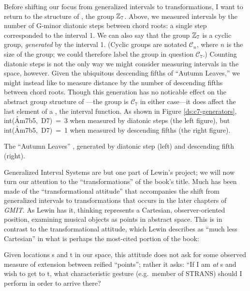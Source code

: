 \documentclass[diss]{subfiles}
\begin{document}
Before shifting our focus from generalized intervals to transformations, I
want to return to the structure of \ivls{}, the group $\mathbb{Z}_7$. Above, we
measured intervals by the number of G-minor diatonic steps between chord
roots: a single step corresponded to the interval 1. We can also say that the
group $\mathbb{Z}_7$ is a cyclic group, \emph{generated} by the interval 1. (Cyclic
groups are notated $\mathcal{C}_n$, where $n$ is the size of the group; we
could therefore label the group in question $\mathcal{C}_7$.) Counting
diatonic steps is not the only way we might consider measuring intervals in
the space, however. Given the ubiquitous descending fifths of “Autumn Leaves,”
we might instead like to measure distance by the number of descending fifths
between chord roots. Though this generation has no noticable effect on the
abstract group structure of \ivls{}---the group is $\mathcal{C}_7$ in either
case---it does affect the last element of a \gis{}, the interval
function. As shown in Figure \ref{ds:c7-generators},
\mbox{int(\h{Am7b5}, D7) = 3} when measured by diatonic steps (the left
figure), but \mbox{int(\h{Am7b5}, D7) = 1} when measured by descending fifths
(the right figure).

\figBeg
  \caption[The “Autumn Leaves” \gis{}, generated by diatonic step and descending
    fifth.]{The “Autumn Leaves” \gis{}, generated by diatonic step (left) and
    descending fifth (right).}
  \label{ds:c7-generators}
\figEnd

Generalized Interval Systems are but one part of Lewin’s project; we will now
turn our attention to the “transformations” of the book’s title. Much has been
made of the “transformational attitude” that accompanies the shift from
generalized intervals to transformations that occurs in the later chapters of
\emph{GMIT}. As Lewin has it, \gis{} thinking represents a Cartesian,
observer-oriented position, examining musical objects as points in abstract
space. This is in contrast to the transformational attitude, which Lewin
describes as “much less Cartesian” in what is perhaps the most-cited portion
of the book:
\begin{quoting}
  \singlespacing
  Given locations s and t in our space, this attitude does not ask for some
  observed measure of extension between reified “points”; rather it asks: “If
  I am \emph{at} s and wish to get to t, what characteristic gesture
  (e.g.~member of STRANS) should I perform in order to arrive
  there?
\end{quoting}
\end{document}
